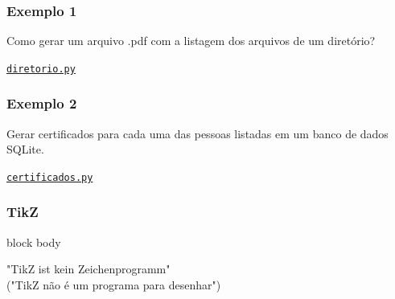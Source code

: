 \documentclass{beamer}
\begin{document}
\begin{frame}
   \frametitle{Exemplo 1}
   Como gerar um arquivo .pdf com a listagem dos arquivos de um diretório?
   \begin{center}
      \href{diretorio.py}{\tt{diretorio.py}}
   \end{center}
\end{frame}
\begin{frame}
   \frametitle{Exemplo 2}
   Gerar certificados para cada uma das pessoas listadas em um banco de dados SQLite.
   \begin{center}
      \href{certificados.py}{\tt{certificados.py}}
   \end{center}
\end{frame}
\begin{frame}
  \frametitle{TikZ}
  \begin{center}
    \begin{minipage}{8cm}
      \begin{beamercolorbox}[sep=1em,wd=8cm]{block body}
        \begin{center}
          "TikZ ist kein Zeichenprogramm" \\("TikZ não é um programa para desenhar")
        \end{center}
      \end{beamercolorbox}
      \end{minipage}
   \end{center}
\end{frame}
\end{document}
